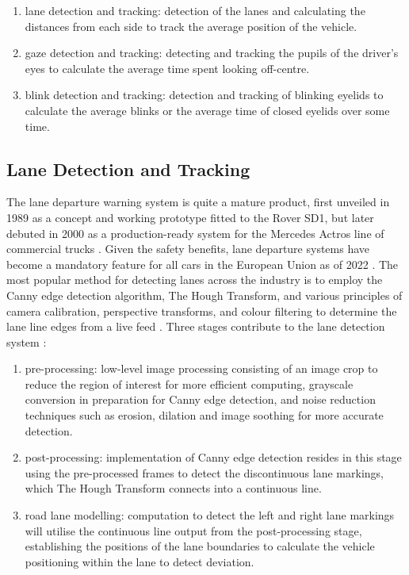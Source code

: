 \documentclass[9pt,conference]{IEEEtran}
\begin{document}
\begin{enumerate}[label=\alph*.]
    \item lane detection and tracking: detection of the lanes and calculating the distances from each side to track the average position of the vehicle.
    \item gaze detection and tracking: detecting and tracking the pupils of the driver's eyes to calculate the average time spent looking off-centre.
    \item blink detection and tracking: detection and tracking of blinking eyelids to calculate the average blinks or the average time of closed eyelids over some time.
\end{enumerate}

\subsection{Lane Detection and Tracking}

The lane departure warning system is quite a mature product, first unveiled in 1989 as a concept and working prototype fitted to the Rover SD1, but later debuted in 2000 as a production-ready system for the Mercedes Actros line of commercial trucks \cite{b1}. Given the safety benefits, lane departure systems have become a mandatory feature for all cars in the European Union as of 2022 \cite{b1}\cite{b2}. The most popular method for detecting lanes across the industry is to employ the Canny edge detection algorithm, The Hough Transform, and various principles of camera calibration, perspective transforms, and colour filtering to determine the lane line edges from a live feed \cite{b1}. Three stages contribute to the lane detection system \cite{b3}:

\begin{enumerate}[label=\alph*.]
    \item pre-processing: low-level image processing consisting of an image crop to reduce the region of interest for more efficient computing, grayscale conversion in preparation for Canny edge detection, and noise reduction techniques such as erosion, dilation and image soothing for more accurate detection.
    \item post-processing: implementation of Canny edge detection resides in this stage using the pre-processed frames to detect the discontinuous lane markings, which The Hough Transform connects into a continuous line.
    \item road lane modelling: computation to detect the left and right lane markings will utilise the continuous line output from the post-processing stage, establishing the positions of the lane boundaries to calculate the vehicle positioning within the lane to detect deviation.
\end{enumerate}
\end{document}
